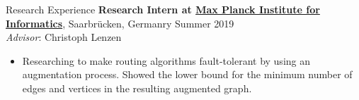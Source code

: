 \documentclass{resume} %
\begin{document}
\begin{rSection}{Research Experience}
	{\bf Research Intern at \href{https://www.mpi-inf.mpg.de/}{Max Planck Institute for Informatics}}, {Saarbr{\"u}cken, Germanry \hfill Summer 2019}
  \\\textit{Advisor}: Christoph Lenzen \smallskip
	\vspace{-0.5em}
	\begin{itemize}[leftmargin=3mm]
		\setlength{\itemsep}{1pt}
		\setlength{\parskip}{0pt}
		\setlength{\parsep}{0pt}
		\renewcommand\labelitemi{$\cdot$}

		\item Researching to make routing algorithms fault-tolerant by using an augmentation 
      process. Showed the lower bound for the minimum number of edges 
		  and vertices in the resulting augmented graph.
	\end{itemize}
\end{rSection}

\end{document}

